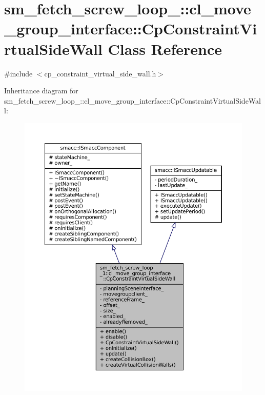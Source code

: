 \hypertarget{classsm__fetch__screw__loop__1_1_1cl__move__group__interface_1_1CpConstraintVirtualSideWall}{}\section{sm\+\_\+fetch\+\_\+screw\+\_\+loop\+\_\+:\+:cl\+\_\+move\+\_\+group\+\_\+interface\+:\+:Cp\+Constraint\+Virtual\+Side\+Wall Class Reference}
\label{classsm__fetch__screw__loop__1_1_1cl__move__group__interface_1_1CpConstraintVirtualSideWall}


{\ttfamily \#include $<$cp\+\_\+constraint\+\_\+virtual\+\_\+side\+\_\+wall.\+h$>$}



Inheritance diagram for sm\+\_\+fetch\+\_\+screw\+\_\+loop\+\_\+:\+:cl\+\_\+move\+\_\+group\+\_\+interface\+:\+:Cp\+Constraint\+Virtual\+Side\+Wall\+:
\nopagebreak
\begin{figure}[H]
\begin{center}
\leavevmode
\includegraphics[width=350pt]{classsm__fetch__screw__loop__1_1_1cl__move__group__interface_1_1CpConstraintVirtualSideWall__inherit__graph}
\end{center}
\end{figure}


